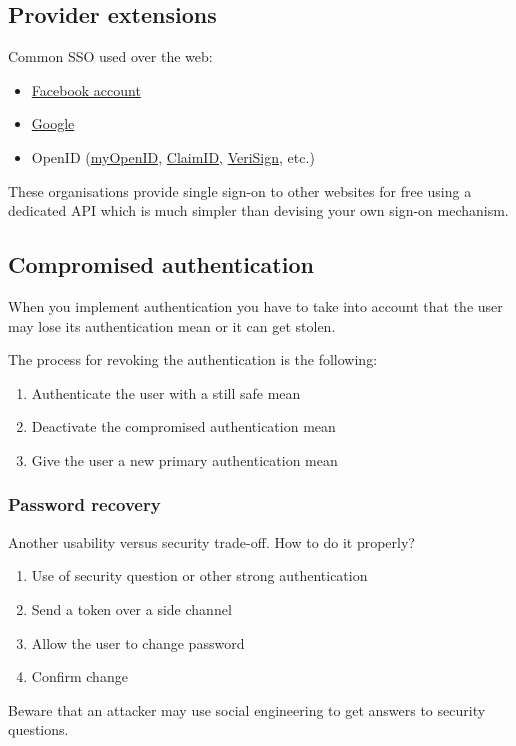 \subsection{Provider extensions}
Common SSO used over the web:
\begin{itemize}
\item \href{http://www.facebook.com/}{Facebook account}
\item \href{http://google.com/}{Google}
\item OpenID (\href{http://myopenid.com/}{myOpenID},
\href{http://claimid.com/}{ClaimID},
\href{http://pip.verisignlabs.com/}{VeriSign}, etc.)
\end{itemize}
These organisations provide single sign-on to other websites for free
using a dedicated API which is much simpler than devising your own
sign-on mechanism.

\subsection{Compromised authentication}
When you implement authentication you have to take into account that the user
may lose its authentication mean or it can get stolen.

The process for revoking the authentication is the following:
\begin{enumerate}
\item Authenticate the user with a still safe mean
\item Deactivate the compromised authentication mean
\item Give the user a new primary authentication mean
\end{enumerate}

\subsubsection*{Password recovery}
Another usability versus security trade-off.
How to do it properly?
\begin{enumerate}
\item Use of security question or other strong authentication
\item Send a token over a side channel
\item Allow the user to change password
\item Confirm change
\end{enumerate}
Beware that an attacker may use social engineering to get answers to security
questions.

